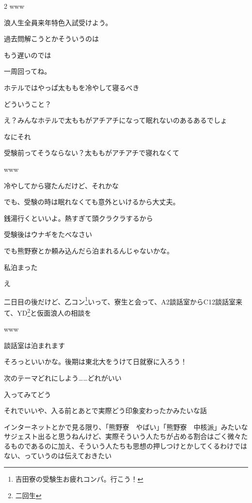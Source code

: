 \begin{multicols}{2}
 www

 浪人生全員来年特色入試受けよう。

 過去問解こうとかそういうのは

 もう遅いのでは

 一周回ってね。

 ホテルではやっぱ太ももを冷やして寝るべき

 どういうこと？

 え？みんなホテルで太ももがアチアチになって眠れないのあるあるでしょ

 なにそれ

 受験前ってそうならない？太ももがアチアチで寝れなくて

 www

 冷やしてから寝たんだけど、それかな

 でも、受験の時は眠れなくても意外といけるから大丈夫。

 銭湯行くといいよ。熱すぎて頭クラクラするから

 受験後はウナギをたべなさい

 でも熊野寮とか頼み込んだら泊まれるんじゃないかな。

 私泊まった

 え

 二日目の後だけど、乙コン\footnote{吉田寮の受験生お疲れコンパ。行こう！}いって、寮生と会って、A2談話室からC12談話室来て、YD\footnote{二回生}と仮面浪人の相談を

 www

 談話室は泊まれます

 そろっといいかな。後期は東北大をうけて日就寮に入ろう！


 次のテーマどれにしよう……どれがいい

 入ってみてどう

 それでいいや、入る前とあとで実際どう印象変わったかみたいな話

 インターネットとかで見る限り、「熊野寮　やばい」「熊野寮　中核派」みたいなサジェスト出ると思うねんけど、実際そういう人たちが占める割合はごく微々たるものであるのに加え、そういう人たちも思想の押しつけとかしてくるわけではない、っていうのは伝えておきたい


\end{multicols}
